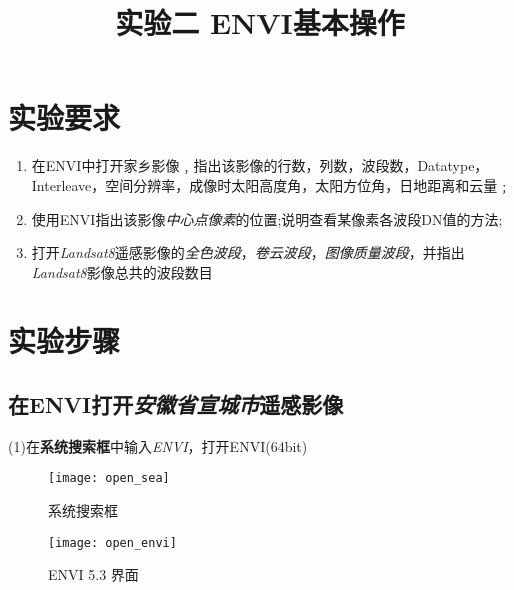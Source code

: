 \documentclass[12pt,a4paper]{article}
\title{\heiti 实验二 \quad ENVI基本操作}
\author{}
\date{ }
\begin{document}
	
	\maketitle	
\setcounter{page}{5}

	
	\section{实验要求}
		\begin{enumerate}
		
		\item 在ENVI中打开家乡影像﹐指出该影像的行数，列数，波段数，Datatype， Interleave，空间分辨率，成像时太阳高度角，太阳方位角，日地距离和云量﹔
		
		
	
		\item 使用ENVI指出该影像\textit{中心点像素}的位置;说明查看某像素各波段DN值的方法;
		
		\item 打开\textit{Landsat8}遥感影像的\textit{全色波段}，\textit{卷云波段}，\textit{图像质量波段}，并指出\textit{Landsat8}影像总共的波段数目
		
		
			
		
		
		
		
	\end{enumerate}
	
	\section{实验步骤}
	
	\subsection{在ENVI打开\textit{安徽省宣城市}遥感影像}
	
	
	
	
	
	(1)在\textbf{系统搜索框}中输入\textit{ENVI}，打开ENVI(64bit)
	\begin{figure}[H]
		\centering
		\texttt{[image: open\_sea]}
		\caption{系统搜索框}
		\label{fig:open1}
	\end{figure}
	\begin{figure}[H]
		\centering
		\texttt{[image: open\_envi]}
		\caption{ENVI 5.3 界面}
		\label{fig:open2}
	\end{figure}
	
\end{document}
